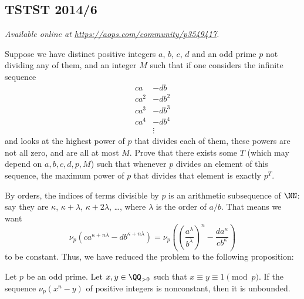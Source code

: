 \documentclass[11pt]{scrartcl}
\begin{document}
\subsection{TSTST 2014/6}
\textsl{Available online at \url{https://aops.com/community/p3549417}.}
\begin{mdframed}[style=mdpurplebox,frametitle={Problem statement}]
Suppose we have distinct positive integers $a$, $b$, $c$, $d$
and an odd prime $p$ not dividing any of them,
and an integer $M$ such that if one considers the infinite sequence
\begin{align*}
  ca &- db \\
  ca^2 &- db^2 \\
  ca^3 &- db^3 \\
  ca^4 &- db^4 \\
  &\vdots
\end{align*}
and looks at the highest power of $p$ that divides each of them,
these powers are not all zero, and are all at most $M$.
Prove that there exists some $T$ (which may depend on $a,b,c,d,p,M$)
such that whenever $p$ divides an element of this sequence,
the maximum power of $p$ that divides that element is exactly $p^T$.
\end{mdframed}
By orders, the indices of terms divisible by $p$
is an arithmetic subsequence of $\NN$:
say they are $\kappa$, $\kappa + \lambda$, $\kappa + 2\lambda$, \dots,
where $\lambda$ is the order of $a/b$.
That means we want
\[ \nu_p \left( c a^{\kappa + n\lambda} - d b^{\kappa + n \lambda} \right)
  = \nu_p \left(
    \left( \frac{a^\lambda}{b^\lambda} \right)^n
    - \frac{d a^\kappa}{c b^{\kappa}} \right)
\]
to be constant.
Thus, we have reduced the problem to the following proposition:
\begin{proposition*}
  Let $p$ be an odd prime.
  Let $x, y \in \QQ_{>0}$ such that $x \equiv y \equiv 1 \pmod p$.
  If the sequence $\nu_p\left( x^n - y \right)$ of positive integers
  is nonconstant, then it is unbounded.
\end{proposition*}
\end{document}
